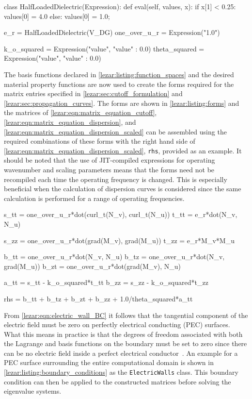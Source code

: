 \begin{python}
class HalfLoadedDielectric(Expression):
    def eval(self, values, x):
        if x[1] < 0.25:
            values[0] = 4.0
        else:
            values[0] = 1.0;

e_r = HalfLoadedDielectric(V_DG)
one_over_u_r = Expression("1.0")

k_o_squared = Expression("value", {"value" : 0.0})
theta_squared = Expression("value", {"value" : 0.0})
\end{python}

The basis functions declared in \lstlistingname{}
 \ref{lezar:listing:function_spaces} and the desired material property
 functions are now used to create the forms required for the matrix
 entries specified in \ref{lezar:sec:cutoff_formulation} and
 \ref{lezar:sec:propagation_curves}. The forms are shown in
 \lstlistingname{} \ref{lezar:listing:forms} and the matrices of
 \eqref{lezar:eqn:matrix_equation_cutoff},
 \eqref{lezar:eqn:matrix_equation_dispersion}, and
 \eqref{lezar:eqn:matrix_equation_dispersion_scaled} can be assembled using
 the required combinations of these forms with the right hand side of
 \eqref{lezar:eqn:matrix_equation_dispersion_scaled}, {\tt rhs}, provided as
 an example.  It should be noted that the use of JIT-compiled expressions for
 operating wavenumber and scaling parameters means that the forms need
 not be recompiled each time the operating frequency is changed. This
 is especially beneficial when the calculation of dispersion curves is
 considered since the same calculation is performed for a range of
 operating frequencies.

\begin{python}
s_tt = one_over_u_r*dot(curl_t(N_v), curl_t(N_u))
t_tt = e_r*dot(N_v, N_u)

s_zz = one_over_u_r*dot(grad(M_v), grad(M_u))
t_zz = e_r*M_v*M_u

b_tt = one_over_u_r*dot(N_v, N_u)
b_tz = one_over_u_r*dot(N_v, grad(M_u))
b_zt = one_over_u_r*dot(grad(M_v), N_u)

a_tt = s_tt - k_o_squared*t_tt
b_zz = s_zz - k_o_squared*t_zz

rhs = b_tt + b_tz + b_zt + b_zz + 1.0/theta_squared*a_tt
\end{python}

From \eqref{lezar:eqn:electric_wall_BC} it follows that the tangential
component of the electric field must be zero on perfectly electrical
conducting (PEC) surfaces. What this means in practice is that the
degrees of freedom associated with both the Lagrange and \nedelec{}
basis functions on the boundary must be set to zero since there can be
no electric field inside a perfect electrical
conductor~\cite{Smith1997}. An example for a PEC surface surrounding the
entire computational domain is shown in \lstlistingname{}
\ref{lezar:listing:boundary_conditions} as the {\tt ElectricWalls}
class. This boundary condition can then be applied to the constructed
matrices before solving the eigenvalue systems.

